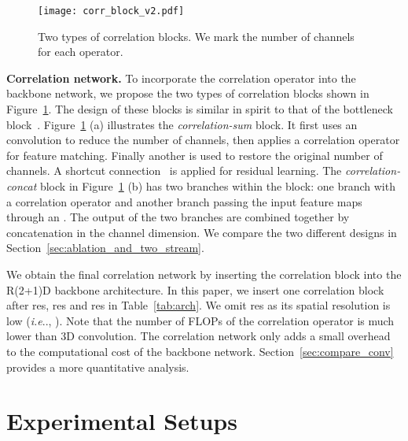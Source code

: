 \documentclass[10pt,twocolumn,letterpaper]{article}
\makeatletter
\DeclareRobustCommand\onedot{\futurelet\@let@token\@onedot}
\def\@onedot{\ifx\@let@token.\else.\null\fi\xspace}
\def\ie{\emph{i.e}\onedot} \def\Ie{\emph{I.e}\onedot}
\makeatother
\begin{document}
\begin{figure}
\begin{center}
   \texttt{[image: corr\_block\_v2.pdf]}
\end{center}
\caption{Two types of correlation blocks. We mark the number of channels for each operator.} 
\label{fig:corr_block}
\end{figure}

\noindent\textbf{Correlation network.} To incorporate the correlation operator into the backbone network, we propose the two types of correlation blocks shown in Figure~\ref{fig:corr_block}. The design of these blocks is similar in spirit to that of the bottleneck block~\cite{KaimingHe16}. Figure~\ref{fig:corr_block} (a) illustrates the \textit{correlation-sum} block. It first uses an  convolution to reduce the number of channels, then applies a correlation operator for feature matching. Finally another  is used to restore the original number of channels. A shortcut connection~\cite{KaimingHe16} is applied for residual learning. The \textit{correlation-concat} block in Figure~\ref{fig:corr_block} (b) has two branches within the block: one branch with a correlation operator and another branch passing the input feature maps through an .  
The output of the two branches are combined together by concatenation in the channel dimension. We compare the two different designs in Section~\ref{sec:ablation_and_two_stream}.  

We obtain the final correlation network by inserting the correlation block into the R(2+1)D backbone architecture. In this paper, we insert one correlation block after res, res and res in Table~\ref{tab:arch}. We omit res as its spatial resolution is low (\ie, ). Note that the number of FLOPs of the correlation operator is much lower than 
3D convolution. The correlation network only adds a small overhead to the computational cost of the backbone network. Section~\ref{sec:compare_conv} provides a more quantitative analysis. \section{ Experimental Setups}\label{sec:exp_setup}
\end{document}

